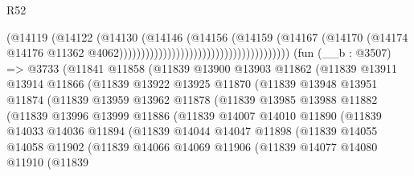\begin{lexlean}{R52}
\begin{coremodule}
                                                                (@14119
                                                                  (@14122
                                                                    (@14130
                                                                      (@14146
                                                                        (@14156
                                                                          (@14159
                                                                            (@14167
                                                                              (@14170
                                                                                (@14174
                                                                                  @14176
                                                                                  @11362
                                                                                  @4062)))))))))))))))))))))))))))))))))))))))
    (fun (__b : @3507) =>
    @3733
      (@11841
        @11858
        (@11839
          @13900
          @13903
          @11862
          (@11839
            @13911
            @13914
            @11866
            (@11839
              @13922
              @13925
              @11870
              (@11839
                @13948
                @13951
                @11874
                (@11839
                  @13959
                  @13962
                  @11878
                  (@11839
                    @13985
                    @13988
                    @11882
                    (@11839
                      @13996
                      @13999
                      @11886
                      (@11839
                        @14007
                        @14010
                        @11890
                        (@11839
                          @14033
                          @14036
                          @11894
                          (@11839
                            @14044
                            @14047
                            @11898
                            (@11839
                              @14055
                              @14058
                              @11902
                              (@11839
                                @14066
                                @14069
                                @11906
                                (@11839
                                  @14077
                                  @14080
                                  @11910
                                  (@11839

\end{coremodule}
\end{lexlean}
